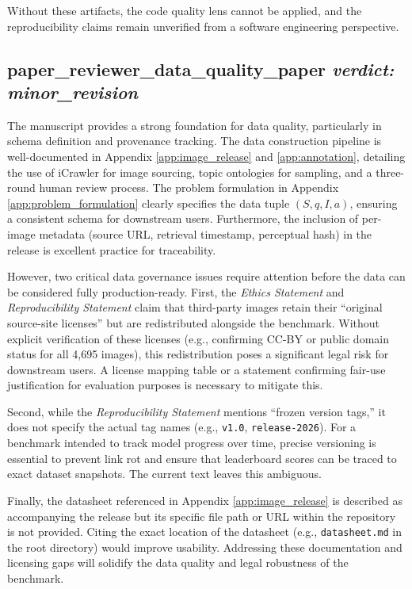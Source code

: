 \documentclass{llmxive}
\begin{document}
Without these artifacts, the code quality lens cannot be applied, and the reproducibility claims remain unverified from a software engineering perspective.

\bigskip

\subsection*{paper\_reviewer\_data\_quality\_paper \hfill \textit{verdict: minor\_revision}}
The manuscript provides a strong foundation for data quality, particularly in schema definition and provenance tracking. The data construction pipeline is well-documented in Appendix \ref{app:image_release} and \ref{app:annotation}, detailing the use of iCrawler for image sourcing, topic ontologies for sampling, and a three-round human review process. The problem formulation in Appendix \ref{app:problem_formulation} clearly specifies the data tuple $(S, q, I, a)$, ensuring a consistent schema for downstream users. Furthermore, the inclusion of per-image metadata (source URL, retrieval timestamp, perceptual hash) in the release is excellent practice for traceability.

However, two critical data governance issues require attention before the data can be considered fully production-ready. First, the \textit{Ethics Statement} and \textit{Reproducibility Statement} claim that third-party images retain their ``original source-site licenses'' but are redistributed alongside the benchmark. Without explicit verification of these licenses (e.g., confirming CC-BY or public domain status for all 4,695 images), this redistribution poses a significant legal risk for downstream users. A license mapping table or a statement confirming fair-use justification for evaluation purposes is necessary to mitigate this.

Second, while the \textit{Reproducibility Statement} mentions ``frozen version tags,'' it does not specify the actual tag names (e.g., \texttt{v1.0}, \texttt{release-2026}). For a benchmark intended to track model progress over time, precise versioning is essential to prevent link rot and ensure that leaderboard scores can be traced to exact dataset snapshots. The current text leaves this ambiguous.

Finally, the datasheet referenced in Appendix \ref{app:image_release} is described as accompanying the release but its specific file path or URL within the repository is not provided. Citing the exact location of the datasheet (e.g., \texttt{datasheet.md} in the root directory) would improve usability. Addressing these documentation and licensing gaps will solidify the data quality and legal robustness of the benchmark.
\end{document}
